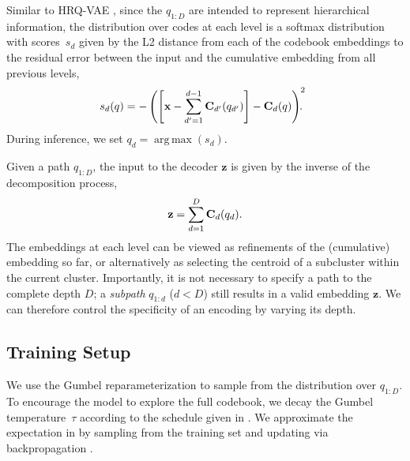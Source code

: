 \documentclass[11pt]{article}
\DeclareMathOperator*{\argmax}{arg\,max}
\begin{document}
 Similar to HRQ-VAE \cite{hosking-etal-2022-hierarchical}, since the $q_{1:D}$ are intended to represent hierarchical information, the distribution over codes at each level is a softmax distribution with scores~$s_d$ given by the L2 distance from each of the codebook embeddings to the residual error between the input and the cumulative embedding from all previous levels, 
\begin{align}
\vspace{-.2cm}
\hspace{-0.25cm} s_d(q) = - \left( \left[\textbf{x} - \sum\limits_{d'=1}^{d-1} \textbf{C}_{d'}(q_{d'}) \right ] - \textbf{C}_d(q)  \right ) ^2\hspace{-0.25cm} .
\vspace{-.2cm}
\end{align}
During inference, we set $q_d = \argmax (s_d)$.

Given a path $q_{1:D}$, the input to the decoder $\textbf{z}$ is given by the inverse of the decomposition process,
\begin{align}
\vspace{-.2cm}
\textbf{z} = \sum\limits_{d=1}^{D} \textbf{C}_d(q_{d}).
\vspace{-.2cm}
\end{align}
The embeddings at each level can be viewed as refinements of the (cumulative) embedding so far, or alternatively as selecting the centroid of a subcluster within the current cluster. Importantly, it is not necessary to specify a path to the complete depth $D$; a \textit{subpath} $q_{1:d}$ ($d<D$) still results in a valid embedding $\textbf{z}$. We can therefore control the specificity of an encoding by varying its depth.









\subsection{Training Setup} 

We use the Gumbel reparameterization
\cite{jang2016categorical,maddison2017concrete,sonderby2017continuous}
to sample from the distribution over $q_{1:D}$. To encourage the model to explore the full codebook, we decay the Gumbel temperature~$\tau$ according to the schedule given in . We approximate the expectation in
 by sampling from the training set and
updating via backpropagation \cite{kingma2013autoencoding}.
\end{document}
